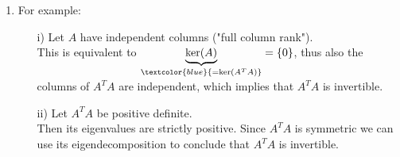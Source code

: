 {
\color{solution}
\begin{enumerate}
	\item For example:
	\begin{enumerate}
		\item[i)] 
		Let $A$ have independent columns ("full column rank").\\
		This is equivalent to $\underbrace{\text{ker}(A)}_{\textcolor{blue}{=\text{ker}(A^TA)}}=\{0\}$, thus also the columns of $A^TA$ are independent, which implies that $A^TA$ is invertible.
		\item[ii)] Let 	$A^TA$ be positive definite.\\
		Then its eigenvalues are strictly positive. Since $A^TA$ is symmetric we can use its eigendecomposition to conclude that $A^TA$ is invertible.
	\end{enumerate}
\end{enumerate}
}